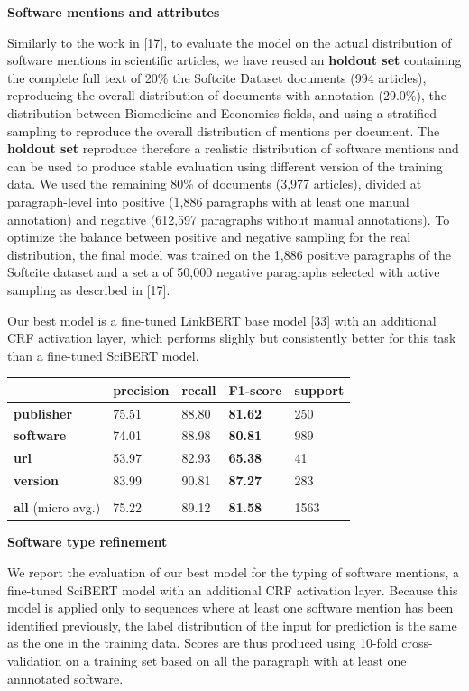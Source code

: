 \documentclass[
]{article}
\begin{document}
\textbf{Software mentions and attributes}

Similarly to the work in {[}17{]}, to evaluate the model on the actual
distribution of software mentions in scientific articles, we have reused
an \textbf{holdout set} containing the complete full text of 20\% the
Softcite Dataset documents (994 articles), reproducing the overall
distribution of documents with annotation (29.0\%), the distribution
between Biomedicine and Economics fields, and using a stratified
sampling to reproduce the overall distribution of mentions per document.
The \textbf{holdout set} reproduce therefore a realistic distribution of
software mentions and can be used to produce stable evaluation using
different version of the training data. We used the remaining 80\% of
documents (3,977 articles), divided at paragraph-level into positive
(1,886 paragraphs with at least one manual annotation) and negative
(612,597 paragraphs without manual annotations). To optimize the balance
between positive and negative sampling for the real distribution, the
final model was trained on the 1,886 positive paragraphs of the Softcite
dataset and a set a of 50,000 negative paragraphs selected with active
sampling as described in {[}17{]}.

Our best model is a fine-tuned LinkBERT base model {[}33{]} with an
additional CRF activation layer, which performs slighly but consistently
better for this task than a fine-tuned SciBERT model.

\begin{longtable}[]{@{}lllll@{}}
\toprule
& precision & recall & \textbf{F1-score} & support\tabularnewline
\midrule
\endhead
\textbf{publisher} & 75.51 & 88.80 & \textbf{81.62} & 250\tabularnewline
\textbf{software} & 74.01 & 88.98 & \textbf{80.81} & 989\tabularnewline
\textbf{url} & 53.97 & 82.93 & \textbf{65.38} & 41\tabularnewline
\textbf{version} & 83.99 & 90.81 & \textbf{87.27} & 283\tabularnewline
& & & &\tabularnewline
\textbf{all} (micro avg.) & 75.22 & 89.12 & \textbf{81.58} &
1563\tabularnewline
\bottomrule
\end{longtable}

\textbf{Software type refinement}

We report the evaluation of our best model for the typing of software
mentions, a fine-tuned SciBERT model with an additional CRF activation
layer. Because this model is applied only to sequences where at least
one software mention has been identified previously, the label
distribution of the input for prediction is the same as the one in the
training data. Scores are thus produced using 10-fold cross-validation
on a training set based on all the paragraph with at least one
annnotated software.
\end{document}

